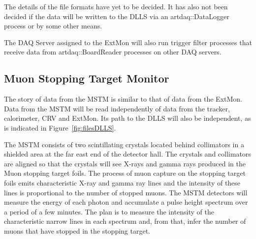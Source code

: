 The details of the file formats have yet to be decided.
It has also not been decided if the data will be written to the DLLS
via an {\code artdaq::DataLogger} process
or by some other means.

\begin{sloppypar}
The DAQ Server assigned to the ExtMon will also run trigger filter processes that receive
data from {\code artdaq::BoardReader} processes on other DAQ servers.
\end{sloppypar}




\subsection{Muon Stopping Target Monitor}
\label{ssec:MSTM}

The story of data from the MSTM is similar to that of data from the ExtMon.
Data from the MSTM  will be read independently of data
from the tracker, calorimeter, CRV and ExtMon.
Its path to the DLLS will also be independent, as is indicated in Figure~\ref{fig:filesDLLS}.

The MSTM consists of two scintillating crystals located behind collimators in a shielded area
at the far east end of the detector hall.
The crystals and collimators are aligned so that the crystals will see X-rays and gamma rays
produced in the Muon stopping target foils.
The process of muon capture on the stopping target foils emits characteristic X-ray and gamma ray
lines and the intensity of these lines is proportional to the number of stopped muons.
The MSTM detectors will measure the energy of each photon and accumulate a pulse height spectrum over a period of a few minutes.
The plan is to measure the intensity of the characteristic narrow lines in each spectrum and,
from that, infer the number of muons that have stopped in the stopping target.

